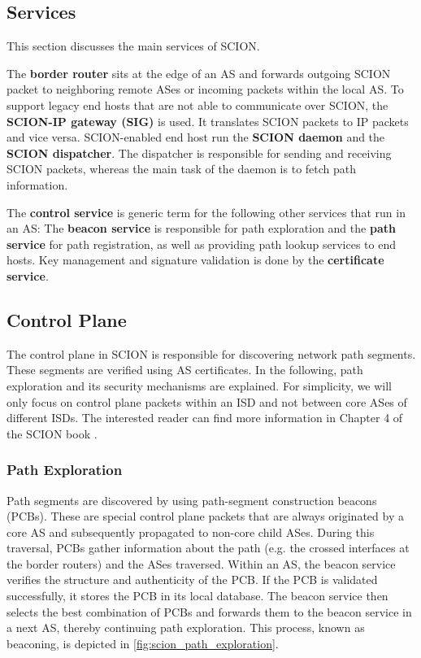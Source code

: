 \subsection{Services}
This section discusses the main services of SCION.

The \textbf{border router} sits at the edge of an AS and forwards outgoing SCION packet to neighboring remote ASes or incoming packets within the local AS.
To support legacy end hosts that are not able to communicate over SCION, the \textbf{SCION-IP gateway (SIG)} is used.
It translates SCION packets to IP packets and vice versa.
SCION-enabled end host run the \textbf{SCION daemon} and the \textbf{SCION dispatcher}.
The dispatcher is responsible for sending and receiving SCION packets, whereas the main task of the daemon is to fetch path information.

The \textbf{control service} is generic term for the following other services that run in an AS:
The \textbf{beacon service} is responsible for path exploration and the \textbf{path service} for path registration, as well as providing path lookup services to end hosts.
Key management and signature validation is done by the \textbf{certificate service}.


\subsection{Control Plane}
\label{sec:control_plane}

The control plane in SCION is responsible for discovering network path segments.
These segments are verified using AS certificates.
In the following, path exploration and its security mechanisms are explained.
For simplicity, we will only focus on control plane packets within an ISD and not between core ASes of different ISDs.
The interested reader can find more information in Chapter 4 of the SCION book \cite{Perrig2022}.

\subsubsection{Path Exploration}
Path segments are discovered by using path-segment construction beacons (PCBs).
These are special control plane packets that are always originated by a core AS and subsequently propagated to non-core child ASes.
During this traversal, PCBs gather information about the path (e.g. the crossed interfaces at the border routers) and the ASes traversed.
Within an AS, the beacon service verifies the structure and authenticity of the PCB.
If the PCB is validated successfully, it stores the PCB in its local database.
The beacon service then selects the best combination of PCBs and forwards them to the beacon service in a next AS, thereby continuing path exploration.
This process, known as beaconing, is depicted in \cref{fig:scion_path_exploration}.

